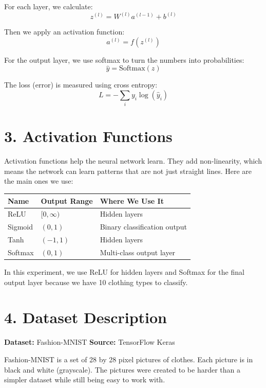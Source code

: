 \documentclass[11pt]{article}
\begin{document}
For each layer, we calculate:
\[
z^{(l)} = W^{(l)} a^{(l-1)} + b^{(l)}
\]

Then we apply an activation function:
\[
a^{(l)} = f(z^{(l)})
\]

For the output layer, we use softmax to turn the numbers into probabilities:
\[
\hat{y} = \text{Softmax}(z)
\]

The loss (error) is measured using cross entropy:
\[
L = -\sum_i y_i \log(\hat{y}_i)
\]

\section*{3. Activation Functions}

Activation functions help the neural network learn. They add non-linearity, which means the network can learn patterns that are not just straight lines. Here are the main ones we use:

\begin{center}
\begin{tabular}{|p{2.5cm}|p{3cm}|p{6cm}|}
\hline
\textbf{Name} & \textbf{Output Range} & \textbf{Where We Use It}\\
\hline
ReLU & $[0,\infty)$ & Hidden layers\\
\hline
Sigmoid & $(0,1)$ & Binary classification output\\
\hline
Tanh & $(-1,1)$ & Hidden layers\\
\hline
Softmax & $(0,1)$ & Multi-class output layer\\
\hline
\end{tabular}
\end{center}

In this experiment, we use ReLU for hidden layers and Softmax for the final output layer because we have 10 clothing types to classify.

\section*{4. Dataset Description}

\textbf{Dataset:} Fashion-MNIST\quad
\textbf{Source:} TensorFlow Keras

Fashion-MNIST is a set of 28 by 28 pixel pictures of clothes. Each picture is in black and white (grayscale). The pictures were created to be harder than a simpler dataset while still being easy to work with.
\end{document}
